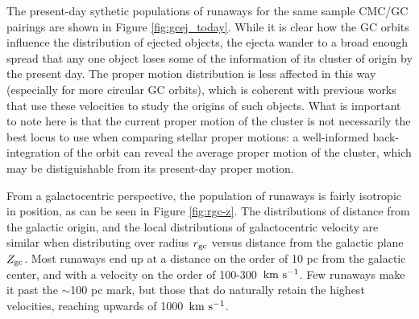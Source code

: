 \documentclass[twocolumn]{aastex631}
\newcommand{\kms}{${\rm km~s^{-1}}$}
\begin{document}
The present-day sythetic populations of runaways for the same sample CMC/GC pairings are shown in Figure \ref{fig:gcej_today}.
While it is clear how the GC orbits influence the distribution of ejected objects, the ejecta wander to a broad enough spread that any one object loses some of the information of its cluster of origin by the present day.
The proper motion distribution is less affected in this way (especially for more circular GC orbits), which is coherent with previous works that use these velocities to study the origins of such objects.
What is important to note here is that the current proper motion of the cluster is not necessarily the best locus to use when comparing stellar proper motions: a well-informed back-integration of the orbit can reveal the average proper motion of the cluster, which may be distiguishable from its present-day proper motion.

\begin{figure*}
    \caption{
        Present-day positions (galactic longitude/latitude) and velocities (projected onto the galactic longitude/latitude directions) for the runaway objects from the sample GCs.
        The color scale again denotes the time of ejection.
        The back-integrated orbits are shown as the light gray trajectories, and the blue "x" is the position/velocity of the GC as measured by \citet{2018MNRAS.478.1520B}.
        The set of sythetic ejecta shown here is the result of downsampling the total set by a factor of ten, to account for the repeated-realizations method described in \S\ref{subsec:binsingle_pop}
    }
    \label{fig:gcej_today}
\end{figure*}

From a galactocentric perspective, the population of runaways is fairly isotropic in position, as can be seen in Figure \ref{fig:rgc-z}.
The distributions of distance from the galactic origin, and the local distributions of galactocentric velocity are similar when distributing over radius $r_{\rm gc}$ versus distance from the galactic plane $Z_{\rm gc}$.
Most runaways end up at a distance on the order of 10 pc from the galactic center, and with a velocity on the order of 100-300~\kms.
Few runaways make it past the $\sim$100 pc mark, but those that do naturally retain the highest velocities, reaching upwards of 1000~\kms.
\end{document}
